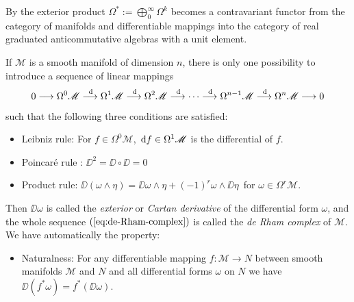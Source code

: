 \begin{bem}
	By the exterior product $\Omega^* := \bigoplus_{0}^{\infty} \Omega^k$ becomes a contravariant functor from the category of manifolds and differentiable mappings into the category of real graduated anticommutative algebras with a unit element.
	\cite[139]{Jaenich-1992}
\end{bem}


\begin{satz}
	\cites[140]{Jaenich-1992}[246]{Jaenich-2002}
	If $\mathscr{M}$ is a smooth manifold of dimension $n$, there is only one possibility to introduce a sequence of linear mappings
	\begin{equation}
		0 \longrightarrow
		\Omega^0 \mathscr{M} \stackrel{\,\mathrm{d}}{\longrightarrow}
		\Omega^1 \mathscr{M} \stackrel{\,\mathrm{d}}{\longrightarrow}
		\Omega^2 \mathscr{M} \stackrel{\,\mathrm{d}}{\longrightarrow}
		\cdots
		\stackrel{\,\mathrm{d}}{\longrightarrow}
		\Omega^{n-1} \mathscr{M} \stackrel{\,\mathrm{d}}{\longrightarrow}
		\Omega^{n} \mathscr{M} 
		\longrightarrow 
		0
		\label{eq:de-Rham-complex}
	\end{equation}
	such that the following three conditions are satisfied:
	\begin{itemize}
		\item[(1)]
		Leibniz rule:
		For $f \in \Omega^0 \mathscr{M}$, $\,\mathrm{d} f \in \Omega^1 \mathscr{M}$ is the differential of $f$.
		
		\item[(2)]
		Poincar\'e rule%
		:
		$\DD^2 = \DD \circ \DD = 0$
		
		\item[(3)]
		Product rule:
		$\DD (\omega \wedge \eta) = \DD \omega \wedge \eta + (-1)^r \omega \wedge \DD \eta\,$
		for $\omega \in \Omega^r \mathscr{M}$.
	\end{itemize}
	Then $\DD \omega$ is called the 
	\emph{exterior} or 
	\emph{Cartan derivative}
	of the differential form $\omega$, and the whole sequence $(\ref{eq:de-Rham-complex})$ is called the 
	\emph{de Rham complex} of $\mathscr{M}$.
	We have automatically the property:
	\begin{itemize}
		\item[(4)]
		Naturalness:
		For any differentiable mapping $f: \mathscr{M} \to N$ between smooth manifolds $\mathscr{M}$ and $N$ and all differential forms $\omega$ on $N$ we have 
		$\DD (f^* \omega) = f^* (\DD \omega)$.
	\end{itemize}
\end{satz}



